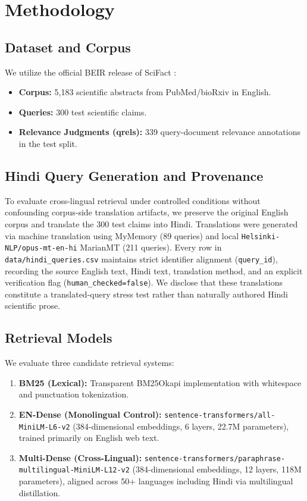 \documentclass[11pt,a4paper]{article}
\begin{document}
\section{Methodology}

\subsection{Dataset and Corpus}
We utilize the official BEIR release of SciFact \cite{thakur2021beir}:
\begin{itemize}
    \item \textbf{Corpus:} 5,183 scientific abstracts from PubMed/bioRxiv in English.
    \item \textbf{Queries:} 300 test scientific claims.
    \item \textbf{Relevance Judgments (qrels):} 339 query-document relevance annotations in the test split.
\end{itemize}

\subsection{Hindi Query Generation and Provenance}
To evaluate cross-lingual retrieval under controlled conditions without confounding corpus-side translation artifacts, we preserve the original English corpus and translate the 300 test claims into Hindi. Translations were generated via machine translation using MyMemory (89 queries) and local \texttt{Helsinki-NLP/opus-mt-en-hi} MarianMT (211 queries). Every row in \texttt{data/hindi\_queries.csv} maintains strict identifier alignment (\texttt{query\_id}), recording the source English text, Hindi text, translation method, and an explicit verification flag (\texttt{human\_checked=false}). We disclose that these translations constitute a translated-query stress test rather than naturally authored Hindi scientific prose.

\subsection{Retrieval Models}
We evaluate three candidate retrieval systems:
\begin{enumerate}
    \item \textbf{BM25 (Lexical):} Transparent BM25Okapi implementation with whitespace and punctuation tokenization.
    \item \textbf{EN-Dense (Monolingual Control):} \texttt{sentence-transformers/all-MiniLM-L6-v2} (384-dimensional embeddings, 6 layers, 22.7M parameters), trained primarily on English web text.
    \item \textbf{Multi-Dense (Cross-Lingual):} \texttt{sentence-transformers/paraphrase-multilingual-MiniLM-L12-v2} (384-dimensional embeddings, 12 layers, 118M parameters), aligned across 50+ languages including Hindi via multilingual distillation.
\end{enumerate}
\end{document}
